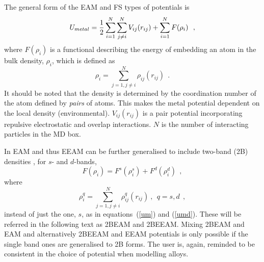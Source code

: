 The general form of the EAM and FS types of potentials is \cite{friedel-52a}
\begin{equation}
U_{metal} = {1 \over 2} \sum_{i=1}^{N} \sum_{j \ne i}^{N} V_{ij}(r_{ij}) +
\sum_{i=1}^{N} F(\rho_{i})~~, \label{um}
\end{equation}
where $F(\rho_{i})$ is a functional describing the energy of embedding
an atom in the bulk density, $\rho_{i}$, which is defined as
\begin{equation}
\rho_{i} = \sum_{j=1, j \ne i}^{N} \rho_{ij}(r_{ij})~~. \label{umd}
\end{equation}
It should be noted that the density is determined by the coordination
number of the atom defined by {\em pairs} of atoms.  This makes the
metal potential dependent on the local density (environmental).
$V_{ij}(r_{ij})$ is a pair potential incorporating repulsive
electrostatic and overlap interactions.  $N$ is the number of
interacting particles in the MD box.

In \D EAM and thus EEAM can be further generalised to include two-band
(2B) densities \cite{ackland-03a,ollson-05a}, for $s$- and $d$-bands,
\begin{equation}
F(\rho_{i})=F^{s}(\rho^{s}_{i})+F^{d}(\rho^{d}_{i})~~, \label{2b}
\end{equation}
where
\begin{equation}
\rho^{q}_{i} = \sum_{j=1, j \ne i}^{N} \rho^{q}_{ij}(r_{ij})~,~~q=s,d~~, \label{2umd}
\end{equation}
instead of just the one, $s$, as in equations~(\ref{um}) and (\ref{umd}).
These will be referred in the following text as 2BEAM and 2BEEAM.
Mixing 2BEAM and EAM and alternatively 2BEEAM and EEAM potentials
is only possible if the single band ones are generalised to 2B forms.
The user is, again, reminded to be consistent in the choice of
potential when modelling alloys.

